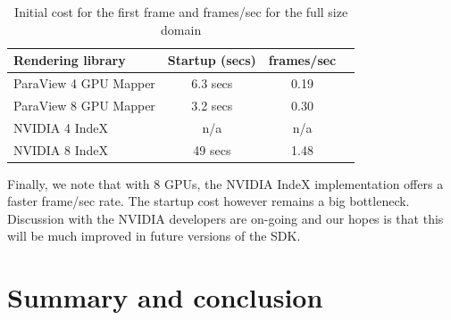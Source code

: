 \documentclass[final,5p,times,twocolumn]{elsarticle}
\begin{document}
\begin{table}[htb]
  \centering
  \caption{
    Initial cost for the first frame and frames/sec for the full size domain
  }
  \label{tab:parallelgpu-tab}

  \begin{tabular}{lccc}
    \hline
    Rendering library & Startup (secs) & frames/sec\\
    \hline
    ParaView 4 GPU Mapper & 6.3 secs &  0.19 \\
    ParaView 8 GPU Mapper & 3.2 secs &  0.30 \\
    NVIDIA 4 IndeX & n/a &  n/a\\
    NVIDIA 8 IndeX & 49 secs &  1.48\\
    \hline

  \end{tabular}
\end{table}

Finally, we note that with 8 GPUs, the NVIDIA IndeX implementation offers a faster
frame/sec rate. The startup cost however remains a big bottleneck. Discussion with
the NVIDIA developers are on-going and our hopes is that this will be much improved
in future versions of the SDK.

\section{Summary and conclusion}
\end{document}

